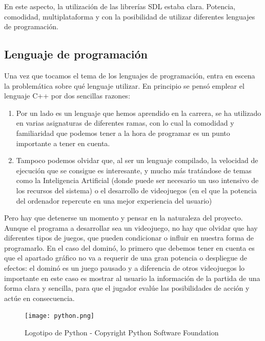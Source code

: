 En este aspecto, la utilización de las librerías SDL estaba clara. Potencia, comodidad, multiplataforma y con la posibilidad
de utilizar diferentes lenguajes de programación.\\

\subsection{Lenguaje de programación}

Una vez que tocamos el tema de los lenguajes de programación, entra en escena la problemática sobre qué lenguaje
utilizar. En principio se pensó emplear el lenguaje C++ por dos sencillas razones:

\begin{enumerate}
    \item Por un lado es un lenguaje que hemos aprendido en la carrera, se ha utilizado en varias asignaturas de
            diferentes ramas, con lo cual la comodidad y familiaridad que podemos tener a la hora de programar
            es un punto importante a tener en cuenta.
    \item Tampoco podemos olvidar que, al ser un lenguaje compilado, la velocidad de ejecución que se consigue
            es interesante, y mucho más tratándose de temas como la Inteligencia Artificial (donde puede ser
            necesario un uso intensivo de los recursos del sistema) o el desarrollo de videojuegos (en el que
            la potencia del ordenador repercute en una mejor experiencia del usuario)
\end{enumerate}

Pero hay que detenerse un momento y pensar en la naturaleza del proyecto. Aunque el programa a desarrollar sea un
videojuego, no hay que olvidar que hay diferentes tipos de juegos, que pueden condicionar o influir en nuestra forma
de programarlo. En el caso del dominó, lo primero que debemos tener en cuenta es que el apartado gráfico no va a
requerir de una gran potencia o despliegue de efectos: el dominó es un juego pausado y a diferencia de otros
videojuegos lo importante en este caso es mostrar al usuario la información de la partida de una forma clara y sencilla,
para que el jugador evalúe las posibilidades de acción y actúe en consecuencia.\\

\begin{figure}[h]
  \label{logo-python}
  \begin{center}
    \texttt{[image: python.png]}
  \end{center}
  \caption{Logotipo de Python - Copyright Python Software Foundation}
\end{figure}


